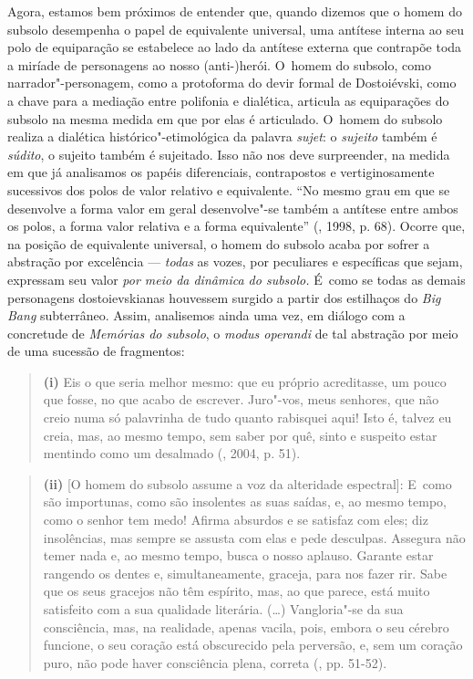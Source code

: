 Agora, estamos bem próximos de entender que, quando dizemos que o homem
do subsolo desempenha o papel de equivalente universal, uma antítese
interna ao seu polo de equiparação se estabelece ao lado da antítese
externa que contrapõe toda a miríade de personagens ao nosso
\mbox{(anti-)herói}. O~homem do subsolo, como narrador"-personagem, como a
protoforma do devir formal de Dostoiévski, como a chave para a mediação
entre polifonia e dialética, articula as equiparações do subsolo na
mesma medida em que por elas é articulado. O~homem do subsolo realiza a
dialética histórico"-etimológica da palavra \emph{sujet}: o
\emph{sujeito} também é \emph{súdito}, o sujeito também é sujeitado.
Isso não nos deve surpreender, na medida em que já analisamos os papéis
diferenciais, contrapostos e vertiginosamente sucessivos dos polos de
valor relativo e equivalente. ``No mesmo grau em que se desenvolve a
forma valor em geral desenvolve"-se também a antítese entre ambos os
polos, a forma valor relativa e a forma equivalente'' (, 1998, p.
68). Ocorre que, na posição de equivalente universal, o homem do subsolo
acaba por sofrer a abstração por excelência --- \emph{todas} as vozes,
por peculiares e específicas que sejam, expressam seu valor \emph{por
meio da dinâmica do subsolo.} É~como se todas as demais personagens
dostoievskianas houvessem surgido a partir dos estilhaços do \emph{Big
Bang} subterrâneo. Assim, analisemos ainda uma vez, em diálogo com a
concretude de \emph{Memórias do subsolo}, o \emph{modus operandi} de tal
abstração por meio de uma sucessão de fragmentos:

\begin{quote}
\textbf{(i)} Eis o que seria melhor mesmo: que eu próprio acreditasse,
um pouco que fosse, no que acabo de escrever. Juro"-vos, meus senhores,
que não creio numa só palavrinha de tudo quanto rabisquei aqui! Isto é,
talvez eu creia, mas, ao mesmo tempo, sem saber por quê, sinto e
suspeito estar mentindo como um desalmado (, 2004, p. 51).
\end{quote}

\begin{quote}
\textbf{(ii)} {[}O homem do subsolo assume a voz da alteridade
espectral{]}: E~como são importunas, como são insolentes as suas saídas,
e, ao mesmo tempo, como o senhor tem medo! Afirma absurdos e se satisfaz
com eles; diz insolências, mas sempre se assusta com elas e pede
desculpas. Assegura não temer nada e, ao mesmo tempo, busca o nosso
aplauso. Garante estar rangendo os dentes e, simultaneamente, graceja,
para nos fazer rir. Sabe que os seus gracejos não têm espírito, mas, ao
que parece, está muito satisfeito com a sua qualidade literária. (\ldots)
Vangloria"-se da sua consciência, mas, na realidade, apenas vacila, pois,
embora o seu cérebro funcione, o seu coração está obscurecido pela
perversão, e, sem um coração puro, não pode haver consciência plena,
correta (, pp. 51-52).
\end{quote}

